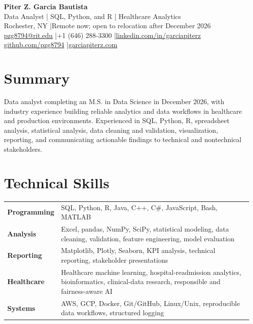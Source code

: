\documentclass[10pt,letterpaper]{article}
\begin{document}
\fontsize{9}{10.4}\selectfont

\begin{center}
  {\Large\bfseries Piter Z. Garcia Bautista}\\[1pt]
  {\large Data Analyst | SQL, Python, and R | Healthcare Analytics}\\[2pt]
  Rochester, NY \enspace|\enspace Remote now; open to relocation after December 2026\\
  \href{mailto:pzg8794@rit.edu}{pzg8794@rit.edu}
  \enspace|\enspace +1 (646) 288-3300
  \enspace|\enspace \href{https://linkedin.com/in/garciapiterz}{linkedin.com/in/garciapiterz}\\
  \href{https://github.com/pzg8794}{github.com/pzg8794}
  \enspace|\enspace \href{https://garciapiterz.com}{garciapiterz.com}
\end{center}

\section*{Summary}
Data analyst completing an M.S. in Data Science in December 2026, with industry
experience building reliable analytics and data workflows in healthcare and
production environments. Experienced in SQL, Python, R, spreadsheet analysis,
statistical analysis, data cleaning and validation, visualization, reporting,
and communicating actionable findings to technical and nontechnical stakeholders.

\section*{Technical Skills}
\begin{tabularx}{\textwidth}{@{}>{\bfseries}l X@{}}
Programming & SQL, Python, R, Java, C++, C\#, JavaScript, Bash, MATLAB\\
Analysis & Excel, pandas, NumPy, SciPy, statistical modeling, data cleaning, validation, feature engineering, model evaluation\\
Reporting & Matplotlib, Plotly, Seaborn, KPI analysis, technical reporting, stakeholder presentations\\
Healthcare & Healthcare machine learning, hospital-readmission analytics, bioinformatics, clinical-data research, responsible and fairness-aware AI\\
Systems & AWS, GCP, Docker, Git/GitHub, Linux/Unix, reproducible data workflows, structured logging\\
\end{tabularx}
\end{document}
